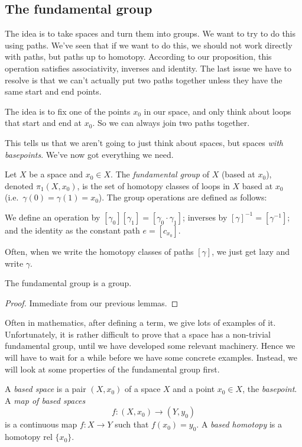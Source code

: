 \documentclass[a4paper]{article}
\begin{document}
\subsection{The fundamental group}
The idea is to take spaces and turn them into groups. We want to try to do this using paths. We've seen that if we want to do this, we should not work directly with paths, but paths up to homotopy. According to our proposition, this operation satisfies associativity, inverses and identity. The last issue we have to resolve is that we can't actually put two paths together unless they have the same start and end points.

The idea is to fix one of the points $x_0$ in our space, and only think about loops that start and end at $x_0$. So we can always join two paths together.

This tells us that we aren't going to just think about spaces, but spaces \emph{with basepoints}. We've now got everything we need.

\begin{defi}
  Let $X$ be a space and $x_0 \in X$. The \emph{fundamental group} of $X$ (based at $x_0$), denoted $\pi_1(X, x_0)$, is the set of homotopy classes of loops in $X$ based at $x_0$ (i.e.\ $\gamma(0) = \gamma(1) = x_0$). The group operations are defined as follows:

  We define an operation by $[\gamma_0][\gamma_1] = [\gamma_0\cdot \gamma_1]$; inverses by $[\gamma]^{-1} = [\gamma^{-1}]$; and the identity as the constant path $e = [c_{x_0}]$.
\end{defi}
Often, when we write the homotopy classes of paths $[\gamma]$, we just get lazy and write $\gamma$.

\begin{thm}
  The fundamental group is a group.
\end{thm}

\begin{proof}
  Immediate from our previous lemmas.
\end{proof}

Often in mathematics, after defining a term, we give lots of examples of it. Unfortunately, it is rather difficult to prove that a space has a non-trivial fundamental group, until we have developed some relevant machinery. Hence we will have to wait for a while before we have some concrete examples. Instead, we will look at some properties of the fundamental group first.

\begin{defi}
  A \emph{based space} is a pair $(X, x_0)$ of a space $X$ and a point $x_0\in X$, the \emph{basepoint}. A \emph{map of based spaces}
  \[
    f: (X, x_0) \to (Y, y_0)
  \]
  is a continuous map $f: X\to Y$ such that $f(x_0) = y_0$. A \emph{based homotopy} is a homotopy rel $\{x_0\}$.
\end{defi}
\end{document}
